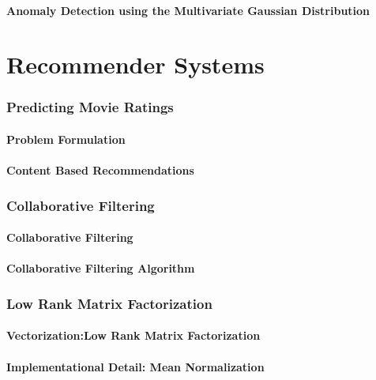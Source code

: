 \documentclass{article}
\begin{document}
\begin{CJK}{UTF8}{gbsn}
\subsection{Anomaly Detection using the Multivariate Gaussian Distribution}
\part{Recommender Systems}
\section{Predicting Movie Ratings}
\subsection{Problem Formulation}
\subsection{Content Based Recommendations}
\section{Collaborative Filtering}
\subsection{Collaborative Filtering}
\subsection{Collaborative Filtering Algorithm}
\section{Low Rank Matrix Factorization}
\subsection{Vectorization:Low Rank Matrix Factorization}
\subsection{Implementational Detail: Mean Normalization}
\end{CJK}
\end{document}
